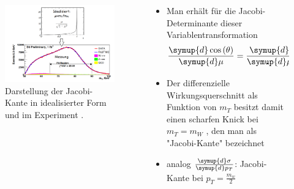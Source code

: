 \documentclass[aspectratio=1610, 9pt]{beamer}
\begin{document}
\begin{frame}
  \begin{columns}
    \begin{column}{0.5\textwidth}
      \begin{figure}
        \includegraphics[width=\textwidth]{images/jacobi-peak.png}
        \caption{Darstellung der Jacobi-Kante in idealisierter Form und im Experiment \cite{vorlesung}.}
      \end{figure}
    \end{column}
    \begin{column}{0.4\textwidth}
      \begin{itemize}
        \item Man erhält für die Jacobi-Determinante dieser Variablentransformation
        \begin{equation*}
          \frac{\symup{d} \cos{(\theta)}}{\symup{d} \mu} = \frac{\symup{d}}{\symup{d}\mu} \sqrt{1-\mu^2} = - \frac{\mu}{\sqrt{1-\mu^2}}
        \end{equation*}
        \item Der differenzielle Wirkungsquerschnitt als Funktion von $m_T$ besitzt damit einen scharfen Knick bei $m_T = m_W$ , den man als "Jacobi-Kante" bezeichnet
        \item analog $\frac{\symup{d} \sigma}{\symup{d} p_T}$: Jacobi-Kante bei $p_T = \frac{m_w}{2}$
      \end{itemize}
    \end{column}
  \end{columns}
\end{frame}
\end{document}
